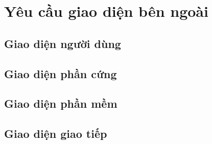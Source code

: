 \section{Yêu cầu giao diện bên ngoài}
\subsection{Giao diện người dùng}
\subsection{Giao diện phần cứng}
\subsection{Giao diện phần mềm}
\subsection{Giao diện giao tiếp}
